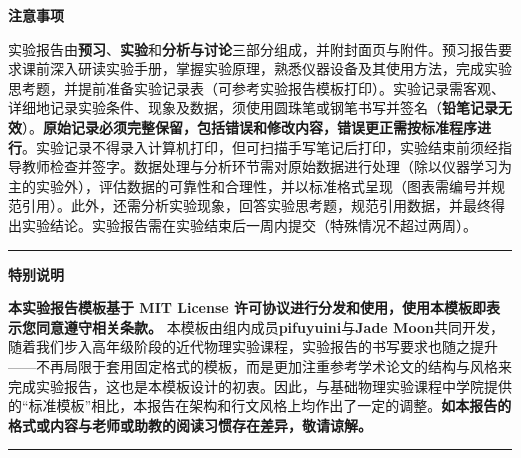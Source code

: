 
\clearpage
\thispagestyle{empty}


\generateExperimentInfo


\noindent\textcolor{fgraygreen}{\textbf{注意事项}}

实验报告由\textbf{预习}、\textbf{实验}和\textbf{分析与讨论}三部分组成，并附封面页与附件。预习报告要求课前深入研读实验手册，掌握实验原理，熟悉仪器设备及其使用方法，完成实验思考题，并提前准备实验记录表（可参考实验报告模板打印）。实验记录需客观、详细地记录实验条件、现象及数据，须使用圆珠笔或钢笔书写并签名（\textbf{铅笔记录无效}）。\textbf{原始记录必须完整保留，包括错误和修改内容，错误更正需按标准程序进行}。实验记录不得录入计算机打印，但可扫描手写笔记后打印，实验结束前须经指导教师检查并签字。数据处理与分析环节需对原始数据进行处理（除以仪器学习为主的实验外），评估数据的可靠性和合理性，并以标准格式呈现（图表需编号并规范引用）。此外，还需分析实验现象，回答实验思考题，规范引用数据，并最终得出实验结论。实验报告需在实验结束后一周内提交（特殊情况不超过两周）。

	
\noindent\textcolor{fgraygreen}{\rule{\textwidth}{1.5pt} }

\noindent\textcolor{fgraygreen}{\textbf{特别说明}}

\textbf{本实验报告模板基于 MIT License 许可协议进行分发和使用，使用本模板即表示您同意遵守相关条款。}
本模板由组内成员\textbf{pifuyuini}与\textbf{Jade Moon}共同开发，随着我们步入高年级阶段的近代物理实验课程，实验报告的书写要求也随之提升——不再局限于套用固定格式的模板，而是更加注重参考学术论文的结构与风格来完成实验报告，这也是本模板设计的初衷。因此，与基础物理实验课程中学院提供的“标准模板”相比，本报告在架构和行文风格上均作出了一定的调整。\textbf{如本报告的格式或内容与老师或助教的阅读习惯存在差异，敬请谅解。}

\noindent\textcolor{fgraygreen}{\rule{\textwidth}{1.5pt} }


	

	

\clearpage
\tableofcontents	
